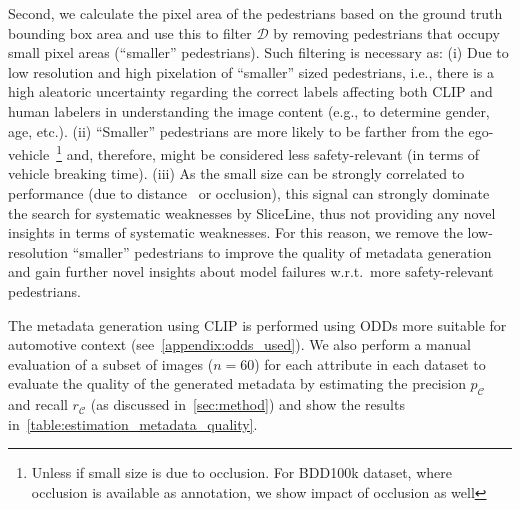 Second, we calculate the pixel area of the pedestrians based on the ground truth bounding box area and use this to filter $\mathcal{D}$ by removing pedestrians that occupy small pixel areas (``smaller'' pedestrians).
Such filtering is necessary as: %
(i) Due to low resolution and high pixelation of ``smaller'' sized pedestrians, i.e., there is a high aleatoric uncertainty regarding the correct labels affecting both CLIP and human labelers in understanding the image content (e.g., to determine gender, age, etc.).
(ii) ``Smaller'' pedestrians are more likely to be farther from the ego-vehicle~\footnote{Unless if small size is due to occlusion. For BDD100k dataset, where occlusion is available as annotation, we show impact of occlusion as well} and, therefore, might be considered less safety-relevant (in terms of vehicle breaking time).
(iii) As the small size can be strongly correlated to performance (due to distance~\citep{Gannamaneni_2021_ICCV, Lyssenko_2021_CVPR} or occlusion), this signal can strongly dominate the search for systematic weaknesses by SliceLine, thus not providing any novel insights in terms of systematic weaknesses. For this reason, we remove the low-resolution ``smaller'' pedestrians to improve the quality of metadata generation and gain further novel insights about model failures w.r.t.\ more safety-relevant pedestrians.  

The metadata generation using CLIP is performed using ODDs more suitable for automotive context (see~\cref{appendix:odds_used}).
We also perform a manual evaluation of a subset of images ($n=60$) for each attribute in each dataset to evaluate the quality of the generated metadata by estimating the precision $p_\mathcal C$ and recall $r_\mathcal C$ (as discussed in~\cref{sec:method}) and show the results in~\cref{table:estimation_metadata_quality}.

